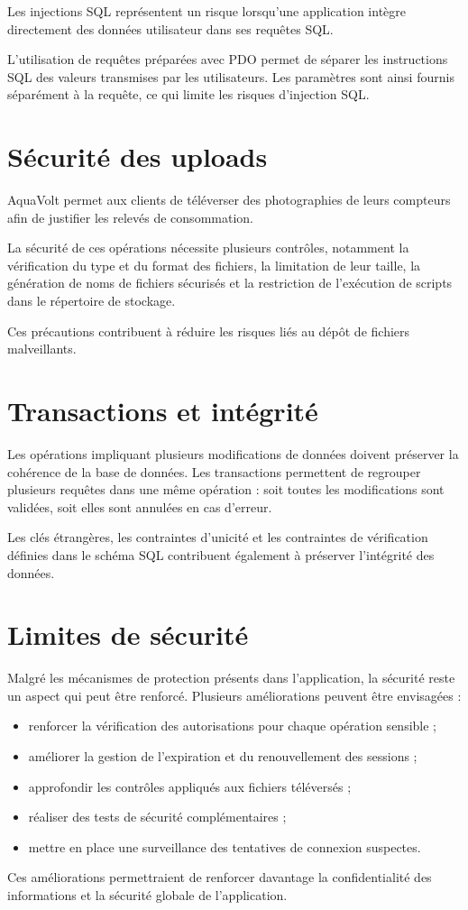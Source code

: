 Les injections SQL représentent un risque lorsqu'une application intègre directement des données utilisateur dans ses requêtes SQL.

L'utilisation de requêtes préparées avec PDO permet de séparer les instructions SQL des valeurs transmises par les utilisateurs. Les paramètres sont ainsi fournis séparément à la requête, ce qui limite les risques d'injection SQL.

\section{Sécurité des uploads}

AquaVolt permet aux clients de téléverser des photographies de leurs compteurs afin de justifier les relevés de consommation.

La sécurité de ces opérations nécessite plusieurs contrôles, notamment la vérification du type et du format des fichiers, la limitation de leur taille, la génération de noms de fichiers sécurisés et la restriction de l'exécution de scripts dans le répertoire de stockage.

Ces précautions contribuent à réduire les risques liés au dépôt de fichiers malveillants.

\section{Transactions et intégrité}

Les opérations impliquant plusieurs modifications de données doivent préserver la cohérence de la base de données. Les transactions permettent de regrouper plusieurs requêtes dans une même opération : soit toutes les modifications sont validées, soit elles sont annulées en cas d'erreur.

Les clés étrangères, les contraintes d'unicité et les contraintes de vérification définies dans le schéma SQL contribuent également à préserver l'intégrité des données.

\section{Limites de sécurité}

Malgré les mécanismes de protection présents dans l'application, la sécurité reste un aspect qui peut être renforcé. Plusieurs améliorations peuvent être envisagées :

\begin{itemize}[leftmargin=*]
    \item renforcer la vérification des autorisations pour chaque opération sensible ;
    \item améliorer la gestion de l'expiration et du renouvellement des sessions ;
    \item approfondir les contrôles appliqués aux fichiers téléversés ;
    \item réaliser des tests de sécurité complémentaires ;
    \item mettre en place une surveillance des tentatives de connexion suspectes.
\end{itemize}

Ces améliorations permettraient de renforcer davantage la confidentialité des informations et la sécurité globale de l'application.

